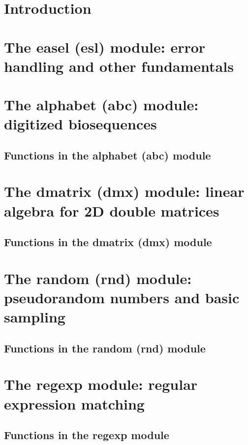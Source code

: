 \documentclass[11pt]{article}
\begin{document}




\newpage
\tableofcontents

\newpage
\section{Introduction}


\newpage
\section{The easel (esl) module: error handling and other fundamentals}


\newpage
\section{The alphabet (abc) module: digitized biosequences}

\subsection{Functions in the alphabet (abc) module}


\newpage
\section{The dmatrix (dmx) module: linear algebra for 2D double matrices}
\subsection{Functions in the dmatrix (dmx) module}


\newpage
\section{The random (rnd) module: pseudorandom numbers and basic sampling}

\subsection{Functions in the random (rnd) module}


\newpage
\section{The regexp module: regular expression matching}

\subsection{Functions in the regexp module}

\end{document}
